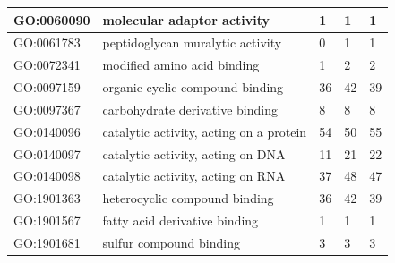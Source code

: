 \documentclass[12pt]{article}
\begin{document}
\begin{longtable}{ | p{2.2cm} | p{4cm} |p{2cm} | p{2cm} | p{2cm} | }
 \hline 
GO:0060090&molecular adaptor activity&1&1&1\\ 
 \hline 
GO:0061783&peptidoglycan muralytic activity&0&1&1\\ 
 \hline 
GO:0072341&modified amino acid binding&1&2&2\\ 
 \hline 
GO:0097159&organic cyclic compound binding&36&42&39\\ 
 \hline 
GO:0097367&carbohydrate derivative binding&8&8&8\\ 
 \hline 
GO:0140096&catalytic activity, acting on a protein&54&50&55\\ 
 \hline 
GO:0140097&catalytic activity, acting on DNA&11&21&22\\ 
 \hline 
GO:0140098&catalytic activity, acting on RNA&37&48&47\\ 
 \hline 
GO:1901363&heterocyclic compound binding&36&42&39\\ 
 \hline 
GO:1901567&fatty acid derivative binding&1&1&1\\ 
 \hline 
GO:1901681&sulfur compound binding&3&3&3\\ 
 \hline 
\end{longtable}
\end{document}
